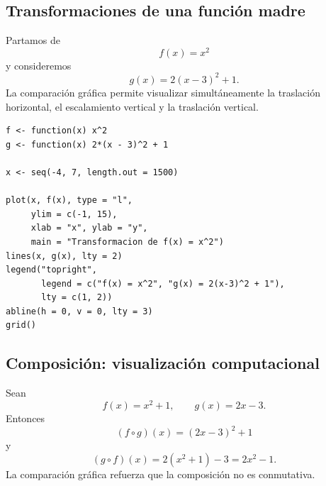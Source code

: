 \documentclass[12pt]{article}
\theoremstyle{remark}
\begin{document}
\subsection{Transformaciones de una función madre}

Partamos de
\[
f(x)=x^2
\]
y consideremos
\[
g(x)=2(x-3)^2+1.
\]
La comparación gráfica permite visualizar simultáneamente la traslación
horizontal, el escalamiento vertical y la traslación vertical.

\begin{center}
\end{center}

\begin{verbatim}
f <- function(x) x^2
g <- function(x) 2*(x - 3)^2 + 1

x <- seq(-4, 7, length.out = 1500)

plot(x, f(x), type = "l",
     ylim = c(-1, 15),
     xlab = "x", ylab = "y",
     main = "Transformacion de f(x) = x^2")
lines(x, g(x), lty = 2)
legend("topright",
       legend = c("f(x) = x^2", "g(x) = 2(x-3)^2 + 1"),
       lty = c(1, 2))
abline(h = 0, v = 0, lty = 3)
grid()
\end{verbatim}

\subsection{Composición: visualización computacional}

Sean
\[
f(x)=x^2+1,\qquad g(x)=2x-3.
\]
Entonces
\[
(f\circ g)(x)=(2x-3)^2+1
\]
y
\[
(g\circ f)(x)=2(x^2+1)-3=2x^2-1.
\]
La comparación gráfica refuerza que la composición no es conmutativa.

\begin{center}
\end{center}
\end{document}
